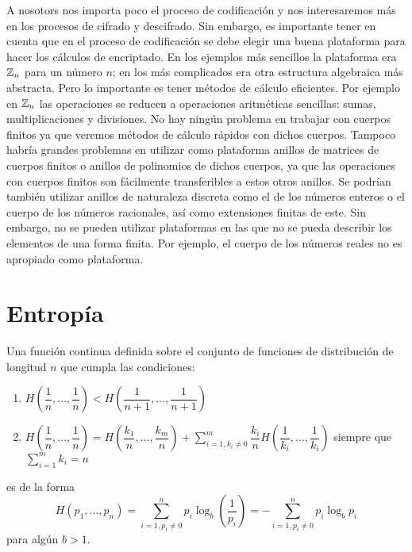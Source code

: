 A nosotors nos importa poco el proceso de codificación y nos interesaremos más en los procesos de cifrado y descifrado. Sin embargo, es importante tener en cuenta que en el proceso de codificación se debe elegir una buena plataforma para hacer los cálculos de encriptado. En los ejemplos más sencillos la plataforma era $\mathbb{Z}_n$ para un número $n$; en los más complicados era otra estructura algebraica más abstracta. Pero lo importante es tener métodos de cálculo eficientes. Por ejemplo en $\mathbb{Z}_n$ las operaciones se reducen a operaciones aritméticas sencillas: sumas, multiplicaciones y divisiones. No hay ningún problema en trabajar con cuerpos finitos ya que veremos métodos de cálculo rápidos con dichos cuerpos. Tampoco habría grandes problemas en utilizar como plataforma anillos de matrices de cuerpos finitos o anillos de polinomios de dichos cuerpos, ya que las operaciones con cuerpos finitos son fácilmente transferibles a estos otros anillos. Se podrían también utilizar anillos de naturaleza discreta como el de los números enteros o el cuerpo de los números racionales, así como extensiones finitas de este. Sin embargo, no se pueden utilizar plataformas en las que no se pueda describir los elementos de una forma finita. Por ejemplo, el cuerpo de los números reales no es apropiado como plataforma.

\section{Entropía}

\begin{teo}
    Una función continua definida sobre el conjunto de funciones de distribución de longitud $n$ que cumpla las condiciones:

    \begin{enumerate}[label=(\arabic*)]
        \item\label{item:l1-i1} $H\left(\dfrac{1}{n},\dots,\dfrac{1}{n}\right) < H\left(\dfrac{1}{n+1},\dots,\dfrac{1}{n+1}\right)$
        \item\label{item:l1-i2} $\displaystyle H\left(\dfrac{1}{n},\dots,\dfrac{1}{n}\right) = H\left(\dfrac{k_1}{n},\dots,\dfrac{k_m}{n}\right)+\sum_{i=1, k_i\neq 0}^m\dfrac{k_i}{n}H\left(\dfrac{1}{k_i},\dots,\dfrac{1}{k_i}\right)$ siempre que $\displaystyle \sum_{i=1}^mk_i=n$
    \end{enumerate}
    es de la forma
    $$H(p_1,\dots,p_n)=\sum_{i=1, p_i\ne 0}^np_i\log_b\left(\dfrac{1}{p_i}\right)=-\sum_{i=1, p_i\ne 0}^np_i\log_bp_i$$
    para algún $b>1$. 
\end{teo}

